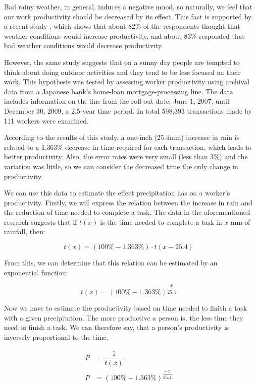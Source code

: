  
Bad rainy weather, in general, induces a negative mood, so naturally, we feel that our work productivity should be decreased by its effect. This fact is supported by a recent study \cite{Leea}, which shows that about 82\% of the respondents thought that weather conditions would increase productivity, and about 83\% responded that bad weather conditions would decrease productivity.

However, the same study suggests that on a sunny day people are tempted to think about doing outdoor activities and they tend to be less focused on their work. This hypothesis was tested by assessing worker productivity using archival data from a Japanese bank’s home-loan mortgage-processing line. The data includes information on the line from the roll-out date, June 1, 2007, until December 30, 2009, a 2.5-year time period. In total 598,393 transactions made by 111 workers were examined. 

According to the results of this study, a one-inch (25.4mm) increase in rain is related to a 1.363\% decrease in time required for each transaction, which leads to better productivity. Also, the error rates were very small (less than 3\%) and the variation was little, so we can consider the decreased time the only change in productivity. 

We can use this data to estimate the effect precipitation has on a worker's productivity. Firstly, we will express the relation between the increase in rain and the reduction of time needed to complete a task. The data in the aforementioned research suggests that if $t(x)$ is the time needed to complete a task in $x$ mm of rainfall, then:

$$t(x)=(100\%-1.363\%) \cdot t(x-25.4)$$

From this, we can determine that this relation can be estimated by an exponential function:

$$t(x)= \left( 100\% - 1.363\% \right)^{\dfrac{x}{25.4}}$$

Now we have to estimate the productivity based on time needed to finish a task with a given precipitation. The more productive a person is, the less time they need to finish a task. We can therefore say, that a person's productivity is inversely proportional to the time. 

\begin{align*}
P &= \dfrac{1}{t(x)}\\
P &= \left( 100\% - 1.363\% \right)^{\dfrac{-x}{25.4} }
\end{align*}

